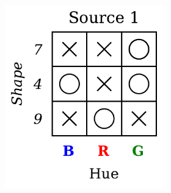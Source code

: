 \begin{dataset}
\begin{figure}[H]
        \begin{subfigure}[b]{0.45\textwidth}
            \centering
            \begin{subfigure}[b]{0.48\textwidth}
                \centering
                \includegraphics[width=\textwidth]{img/datasets/2-CGO_fact=hue_env=0.pdf}
            \end{subfigure}
            \begin{subfigure}[b]{0.48\textwidth}
                \centering

\end{subfigure}
\end{subfigure}
\end{figure}
\end{dataset}
